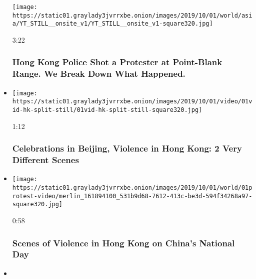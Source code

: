 \begin{itemize}
  \texttt{[image: https://static01.graylady3jvrrxbe.onion/images/2019/10/01/world/asia/YT\_STILL\_\_onsite\_v1/YT\_STILL\_\_onsite\_v1-square320.jpg]}

  3:22

  \hypertarget{hong-kong-police-shot-a-protester-at-point-blank-range-we-break-down-what-happened}{%
  \subsubsection{Hong Kong Police Shot a Protester at Point-Blank Range.
  We Break Down What
  Happened.}\label{hong-kong-police-shot-a-protester-at-point-blank-range-we-break-down-what-happened}}
\item
  \href{https://www.nytimes3xbfgragh.onion/video/world/asia/100000006745689/china-national-day-hong-kong-protests.html?action=click\&module=video-series-bar\&region=header\&pgtype=Article\&playlistId=video/hk-protest}{}

  \texttt{[image: https://static01.graylady3jvrrxbe.onion/images/2019/10/01/video/01vid-hk-split-still/01vid-hk-split-still-square320.jpg]}

  1:12

  \hypertarget{celebrations-in-beijing-violence-in-hong-kong-2-very-different-scenes}{%
  \subsubsection{Celebrations in Beijing, Violence in Hong Kong: 2 Very
  Different
  Scenes}\label{celebrations-in-beijing-violence-in-hong-kong-2-very-different-scenes}}
\item
  \href{https://www.nytimes3xbfgragh.onion/video/world/asia/100000006745666/hong-kong-protest-china.html?action=click\&module=video-series-bar\&region=header\&pgtype=Article\&playlistId=video/hk-protest}{}

  \texttt{[image: https://static01.graylady3jvrrxbe.onion/images/2019/10/01/world/01protest-video/merlin\_161894100\_531b9d68-7612-413c-be3d-594f34268a97-square320.jpg]}

  0:58

  \hypertarget{scenes-of-violence-in-hong-kong-on-chinas-national-day}{%
  \subsubsection{Scenes of Violence in Hong Kong on China's National
  Day}\label{scenes-of-violence-in-hong-kong-on-chinas-national-day}}
\item
  \href{https://www.nytimes3xbfgragh.onion/video/world/asia/100000006702862/hong-kong-protests-police-officers.html?action=click\&module=video-series-bar\&region=header\&pgtype=Article\&playlistId=video/hk-protest}{}


\end{itemize}
